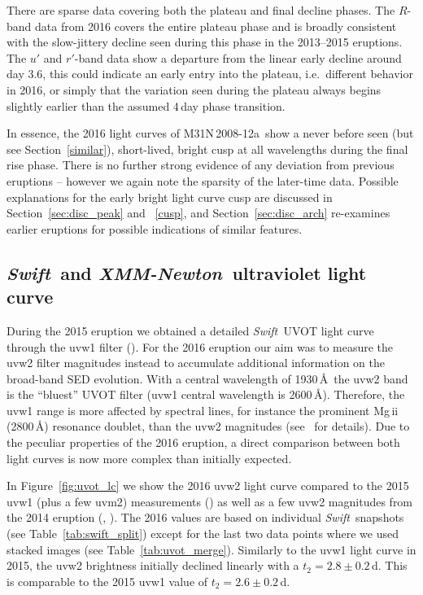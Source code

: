 \documentclass[twocolumn,tighten]{aastex6}
\def\swift{{\it Swift~}}
\def\xmm{{\it XMM-Newton~}}
\def\novak{{M31N\,2008-12a}}
\newcommand{\otwok}{\citetalias{2015A&A...580A..45D}}
\newcommand{\xtwok}{\citetalias{2015A&A...580A..46H}}
\newcommand{\othreek}{\citetalias{2016ApJ...833..149D}}
\newcommand{\hstspec}{\citetalias{2017ApJ...847...35D}}
\begin{document}
There are sparse data covering both the plateau and final decline phases.   The $R$-band data from 2016 covers the entire plateau phase and is broadly consistent with the slow-jittery decline seen during this phase in the 2013--2015 eruptions.  The $u'$ and $r'$-band data show a departure from the linear early decline around day 3.6, this could indicate an early entry into the plateau, i.e.\ different behavior in 2016, or simply that the variation seen during the plateau always begins slightly earlier than the assumed 4\,day phase transition.

In essence, the 2016 light curves of \novak\ show a never before seen (but see Section~\ref{similar}), short-lived, bright cusp at all wavelengths during the final rise phase.  There is no further strong evidence of any deviation from previous eruptions -- however we again note the sparsity of the later-time data.  Possible explanations for the early bright light curve cusp are discussed in Section~\ref{sec:disc_peak} and ~\ref{cusp}, and Section~\ref{sec:disc_arch} re-examines earlier eruptions for possible indications of similar features.

\subsection{\swift and \xmm ultraviolet light curve}\label{sec:uvot_lc}

During the 2015 eruption we obtained a detailed \swift UVOT light curve through the uvw1 filter (\othreek). For the 2016 eruption our aim was to measure the uvw2 filter magnitudes instead to accumulate additional information on the broad-band SED evolution. With a central wavelength of 1930\,\AA\ the uvw2 band is the ``bluest'' UVOT filter (uvw1 central wavelength is 2600\,\AA). Therefore, the uvw1 range is more affected by spectral lines, for instance the prominent Mg\,{\sc ii} (2800\,\AA) resonance doublet, than the uvw2 magnitudes (see \hstspec\ for details). Due to the peculiar properties of the 2016 eruption, a direct comparison between both light curves is now more complex than initially expected.

In Figure~\ref{fig:uvot_lc} we show the 2016 uvw2 light curve compared to the 2015 uvw1 (plus a few uvm2) measurements (\othreek) as well as a few uvw2 magnitudes from the 2014 eruption (\xtwok, \otwok). The 2016 values are based on individual \swift snapshots (see Table~\ref{tab:swift_split}) except for the last two data points where we used stacked images (see Table~\ref{tab:uvot_merge}). Similarly to the uvw1 light curve in 2015, the uvw2 brightness initially declined linearly with a $t_2 = 2.8 \pm 0.2$\,d. This is comparable to the 2015 uvw1 value of $t_2 = 2.6\pm0.2$\,d.
\end{document}
